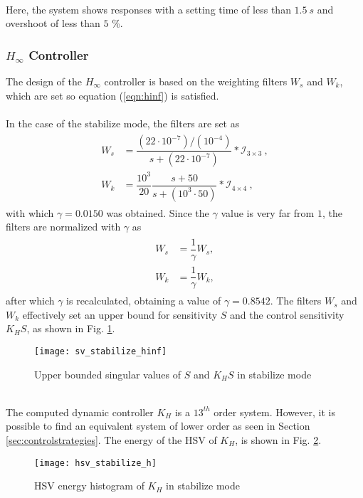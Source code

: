 \\Here, the system shows responses with a setting time of less than $1.5\ s$ and overshoot of less than $5$ \%.
\subsubsection{$H_\infty$ Controller}
The design of the $H_\infty$ controller is based on the weighting filters $W_s$ and $W_k$, which are set so equation (\ref{eqn:hinf}) is satisfied.\\\\
In the case of the stabilize mode, the filters are set as 
\begin{align}
\begin{split}
W_{s} &= \dfrac{(22\cdot10^{-7})/(10^{-4})}{s + (22\cdot10^{-7})}*\mathcal{I}_{3\times 3}\ ,\\[5px]
W_{k} &= \dfrac{10^{3}}{20}\dfrac{s+50}{s+(10^{3}\cdot 50)}*\mathcal{I}_{4\times 4}\ ,
\end{split}
\end{align}
with which $\gamma = 0.0150$ was obtained. Since the $\gamma$ value is very far from $1$, the filters are normalized with $\gamma$ as
\begin{align}
\begin{split}
W_{s} &= \dfrac{1}{\gamma} W_{s},\\[5px]
W_{k} &= \dfrac{1}{\gamma} W_{k},
\end{split}
\end{align}
after which $\gamma$ is recalculated, obtaining a value of $\gamma = 0.8542 $. The filters $W_s$ and $W_k$  effectively set an upper bound for sensitivity $S$ and the control sensitivity $K_{H}S$, as shown in Fig. \ref{fig:sv_stabilize_hinf}.
\begin{figure}[h]
\begin{center}
\texttt{[image: sv\_stabilize\_hinf]}  
\caption{Upper bounded singular values of $S$ and $K_{H}S$ in stabilize mode} 
\label{fig:sv_stabilize_hinf}
\end{center}
\end{figure}
\\The computed dynamic controller $K_H$ is a $13^{th}$ order system. However, it is possible to find an equivalent system of lower order as seen in Section \ref{sec:controlstrategies}.
The energy of the HSV of $K_H$, is shown in Fig. \ref{fig:hsv_stabilize_h}.
\begin{figure}[h]
\begin{center}
\texttt{[image: hsv\_stabilize\_h]}  
\caption{HSV energy histogram of $K_H$ in stabilize mode} 
\label{fig:hsv_stabilize_h}
\end{center}
\end{figure}
